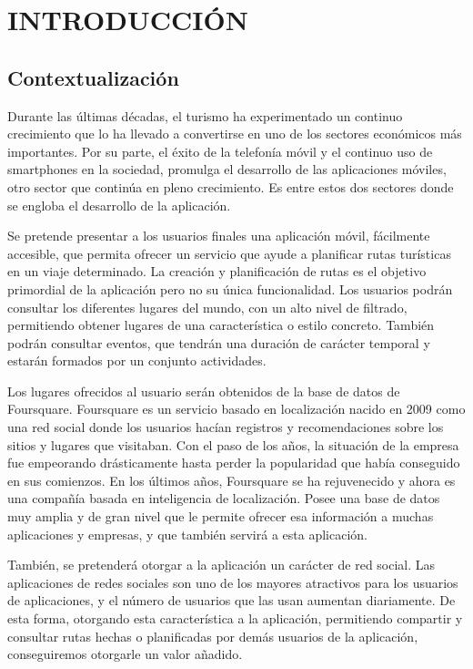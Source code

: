 \setcounter{page}{1}
\chapter[Introducción]{
  \label{chp:introduccion}
  INTRODUCCIÓN
}
\thispagestyle{numberingStyle}
\pagestyle{numberingStyle}


\section{Contextualización}
Durante las últimas décadas, el turismo ha experimentado un continuo crecimiento que lo ha llevado a convertirse en uno de los sectores económicos más importantes. Por su parte, el éxito de la telefonía móvil y el continuo uso de smartphones en la sociedad, promulga el desarrollo de las aplicaciones móviles, otro sector que continúa en pleno crecimiento. Es entre estos dos sectores donde se engloba el desarrollo de la aplicación.

Se pretende presentar a los usuarios finales una aplicación móvil, fácilmente accesible, que permita ofrecer un servicio que ayude a planificar rutas turísticas en un viaje determinado. La creación y planificación de rutas es el objetivo primordial de la aplicación pero no su única funcionalidad. Los usuarios podrán consultar los diferentes lugares del mundo, con un alto nivel de filtrado, permitiendo obtener lugares de una característica o estilo concreto. También podrán consultar eventos, que tendrán una duración de carácter temporal y estarán formados por un conjunto actividades.

Los lugares ofrecidos al usuario serán obtenidos de la base de datos de Foursquare. Foursquare es un servicio basado en localización nacido en 2009 como una red social donde los usuarios hacían registros y recomendaciones sobre los sitios y lugares que visitaban. Con el paso de los años, la situación de la empresa fue empeorando drásticamente hasta perder la popularidad que había conseguido en sus comienzos. En los últimos años, Foursquare se ha rejuvenecido y ahora es una compañía basada en inteligencia de localización. Posee una base de datos muy amplia y de gran nivel que le permite ofrecer esa información a muchas aplicaciones y empresas, y que también servirá a esta aplicación.

También, se pretenderá otorgar a la aplicación un carácter de red social. Las aplicaciones de redes sociales son uno de los mayores atractivos para los usuarios de aplicaciones, y el número de usuarios que las usan aumentan diariamente. De esta forma, otorgando esta característica a la aplicación, permitiendo compartir y consultar rutas hechas o planificadas por demás usuarios de la aplicación, conseguiremos otorgarle un valor añadido.


